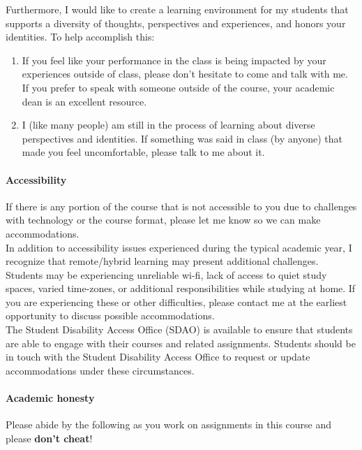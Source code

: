 \documentclass[11pt]{article}
\begin{document}
Furthermore, I would like to create a learning environment for my students that supports a diversity of thoughts, perspectives and experiences, and honors your identities. To help accomplish this:

\begin{enumerate}
\item If you feel like your performance in the class is being impacted by your experiences outside of class, please don’t hesitate to come and talk with me. If you prefer to speak with someone outside of the course, your academic dean is an excellent resource.
\item I (like many people) am still in the process of learning about diverse perspectives and identities. If something was said in class (by anyone) that made you feel uncomfortable, please talk to me about it.
\end{enumerate}

\paragraph{Accessibility}

If there is any portion of the course that is not accessible to you due to challenges with technology or the course format, please let me know so we can make accommodations.\\

In addition to accessibility issues experienced during the typical academic year, I recognize that remote/hybrid learning may present additional challenges. Students may be experiencing unreliable wi-fi, lack of access to quiet study spaces, varied time-zones, or additional responsibilities while studying at home. If you are experiencing these or other difficulties, please contact me at the earliest opportunity to discuss possible accommodations. \\

The Student Disability Access Office (SDAO) is available to ensure that students are able to engage with their courses and related assignments. Students should be in touch with the Student Disability Access Office to request or update accommodations under these circumstances. 

\paragraph{Academic honesty} 

Please abide by the following as you work on assignments in this course and please \textbf{don't cheat}! 
\end{document}
